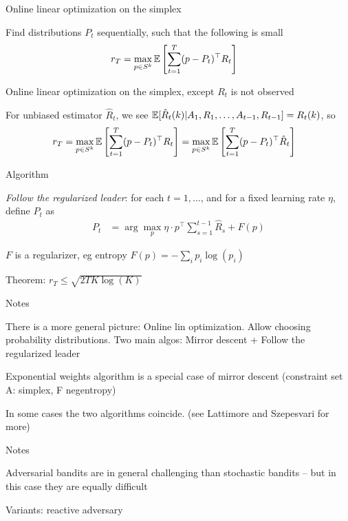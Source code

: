 \documentclass[english]{article}
\begin{document}
\item {Online linear optimization on the simplex}
\bitem
\item Find distributions $P_t$ sequentially, such that the following is small
\begin{align*}
r_T &= \max_{p\in S^k} \mathbb{E}\left[\sum_{t=1}^T (p -P_t)^\top R_{t}\right]
\end{align*}
\item Online linear optimization on the simplex, except $R_t$ is not observed
\item For unbiased estimator $\hat R_t$, we see $\mathbb{E}[\hat R_t(k)|A_1,R_1,\ldots,A_{t-1},R_{t-1}] =R_t(k)$, so 
\begin{align*}
r_T &
= \max_{p\in S^k} \mathbb{E}\left[\sum_{t=1}^T (p -P_t)^\top R_{t}\right]
= \max_{p\in S^k} \mathbb{E}\left[\sum_{t=1}^T (p -P_t)^\top \hat R_{t}\right]
\end{align*}
\eitem




\item {Algorithm}
\bitem
\item {\it Follow the regularized leader}: for each $t=1,\ldots$, and for a fixed learning rate $\eta$, define $P_t$ as
\begin{align*}
P_t &
= \arg\max_{p} \eta\cdot p^\top \sum_{s=1}^{t-1} \hat R_{s}+ F(p)
\end{align*}
\item $F$ is a regularizer, eg entropy $F(p) = -\sum_i p_i \log(p_i)$
\item Theorem: $r_T \le \sqrt{2TK\log(K)}$
\eitem



\item {Notes}
\bitem
\item There is a more general picture: Online lin optimization. Allow choosing probability distributions. Two main algos: Mirror descent + Follow the regularized leader
\item  Exponential weights algorithm is a special case of mirror descent (constraint set A: simplex, F negentropy)
\item In some cases the two algorithms coincide. (see Lattimore and Szepesvari for more)
\eitem



\item {Notes}
\bitem
\item Adversarial bandits are in general challenging than stochastic bandits -- but in this case they are equally difficult
\item Variants: reactive adversary
\eitem
\end{document}
